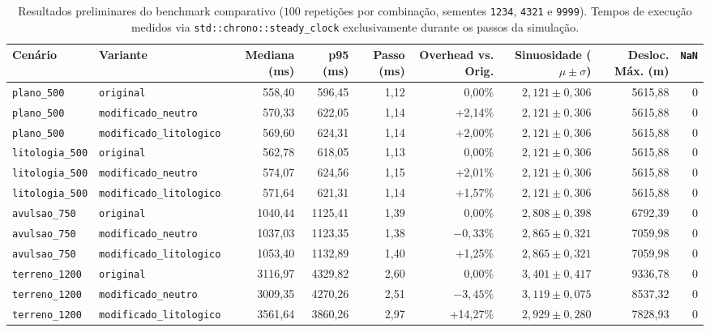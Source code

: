 \documentclass[9pt,a4paper,twocolumn]{extarticle}
\begin{document}
\begin{table}[t]
\caption{Resultados preliminares do benchmark comparativo ($100$ repetições por combinação, sementes \texttt{1234}, \texttt{4321} e \texttt{9999}). Tempos de execução medidos via \texttt{std::chrono::steady\_clock} exclusivamente durante os passos da simulação.}
\label{tab:resultado}
\centering
\scriptsize
\begin{tabular}{llrrrrrrr}
\toprule
Cenário & Variante & Mediana (ms) & p95 (ms) & Passo (ms) & Overhead vs. Orig. & Sinuosidade ($\mu \pm \sigma$) & Desloc. Máx. (m) & \texttt{NaN} \\
\midrule
\texttt{plano\_500} & \texttt{original} & 558,40 & 596,45 & 1,12 & 0,00\% & $2{,}121 \pm 0{,}306$ & 5615,88 & 0 \\
\texttt{plano\_500} & \texttt{modificado\_neutro} & 570,33 & 622,05 & 1,14 & +2,14\% & $2{,}121 \pm 0{,}306$ & 5615,88 & 0 \\
\texttt{plano\_500} & \texttt{modificado\_litologico} & 569,60 & 624,31 & 1,14 & +2,00\% & $2{,}121 \pm 0{,}306$ & 5615,88 & 0 \\
\midrule
\texttt{litologia\_500} & \texttt{original} & 562,78 & 618,05 & 1,13 & 0,00\% & $2{,}121 \pm 0{,}306$ & 5615,88 & 0 \\
\texttt{litologia\_500} & \texttt{modificado\_neutro} & 574,07 & 624,56 & 1,15 & +2,01\% & $2{,}121 \pm 0{,}306$ & 5615,88 & 0 \\
\texttt{litologia\_500} & \texttt{modificado\_litologico} & 571,64 & 621,31 & 1,14 & +1,57\% & $2{,}121 \pm 0{,}306$ & 5615,88 & 0 \\
\midrule
\texttt{avulsao\_750} & \texttt{original} & 1040,44 & 1125,41 & 1,39 & 0,00\% & $2{,}808 \pm 0{,}398$ & 6792,39 & 0 \\
\texttt{avulsao\_750} & \texttt{modificado\_neutro} & 1037,03 & 1123,35 & 1,38 & $-0{,}33\%$ & $2{,}865 \pm 0{,}321$ & 7059,98 & 0 \\
\texttt{avulsao\_750} & \texttt{modificado\_litologico} & 1053,40 & 1132,89 & 1,40 & +1,25\% & $2{,}865 \pm 0{,}321$ & 7059,98 & 0 \\
\midrule
\texttt{terreno\_1200} & \texttt{original} & 3116,97 & 4329,82 & 2,60 & 0,00\% & $3{,}401 \pm 0{,}417$ & 9336,78 & 0 \\
\texttt{terreno\_1200} & \texttt{modificado\_neutro} & 3009,35 & 4270,26 & 2,51 & $-3{,}45\%$ & $3{,}119 \pm 0{,}075$ & 8537,32 & 0 \\
\texttt{terreno\_1200} & \texttt{modificado\_litologico} & 3561,64 & 3860,26 & 2,97 & +14,27\% & $2{,}929 \pm 0{,}280$ & 7828,93 & 0 \\
\bottomrule
\end{tabular}
\end{table}
\end{document}
